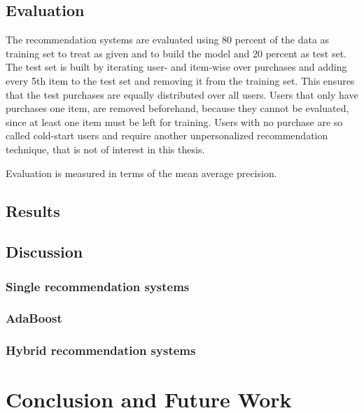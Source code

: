 \documentclass[10pt]{reportMaster}
\begin{document}
\section{Evaluation}
\label{sec:eval}

The recommendation systems are evaluated using 80 percent of the data as training set to treat as given and to build the model and 20 percent as test set.
The test set is built by iterating user- and item-wise over purchases and adding every 5th item to the test set and removing it from the training set.
This ensures that the test purchases are equally distributed over all users.
Users that only have purchases one item, are removed beforehand, because they cannot be evaluated, since at least one item must be left for training.
Users with no purchase are so called cold-start users and require another unpersonalized recommendation technique, that is not of interest in this thesis.

Evaluation is measured in terms of the mean average precision.

\section{Results}

% 


\section{Discussion}

\subsection{Single recommendation systems}


\subsection{AdaBoost}

\subsection{Hybrid recommendation systems}




\chapter{Conclusion and Future Work}











\end{document}
